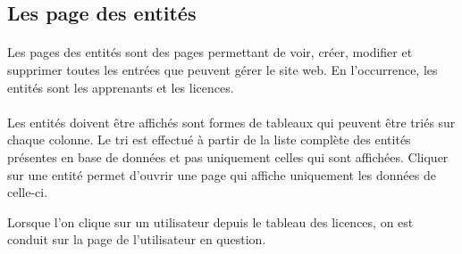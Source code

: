 \subsection{Les page des entités}
\label{subsec:entities-pages}

\paragraph{}
Les pages des entités sont des pages permettant de voir, créer, modifier et supprimer toutes les entrées que peuvent gérer le site web.
En l'occurrence, les entités sont les apprenants et les licences.

\paragraph{}
Les entités doivent être affichés sont formes de tableaux qui peuvent être triés sur chaque colonne.
Le tri est effectué à partir de la liste complète des entités présentes en base de données et pas uniquement celles qui sont affichées.
Cliquer sur une entité permet d'ouvrir une page qui affiche uniquement les données de celle-ci.

Lorsque l'on clique sur un utilisateur depuis le tableau des licences, on est conduit sur la page de l'utilisateur en question.
